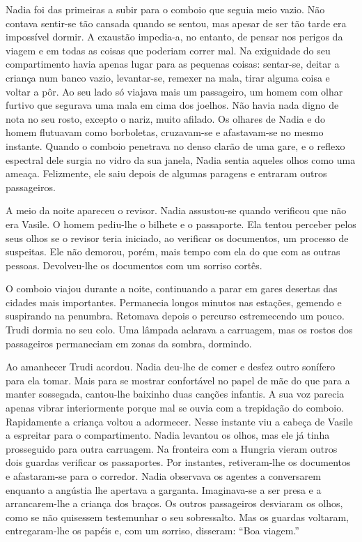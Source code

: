 Nadia foi das primeiras a subir para o comboio que
seguia meio vazio. Não contava sentir-se tão cansada quando se sentou,
mas apesar de ser tão tarde era impossível dormir. A exaustão
impedia-a, no entanto, de pensar nos perigos da viagem e em todas as
coisas que poderiam correr mal. Na exiguidade do seu compartimento havia
apenas lugar para as pequenas coisas: sentar-se, deitar a criança num
banco vazio, levantar-se, remexer na mala, tirar alguma coisa e voltar a
pôr. Ao seu lado só viajava mais um passageiro, um homem com olhar
furtivo que
segurava uma mala em cima dos joelhos. Não havia nada digno de nota no
seu rosto, excepto o nariz, muito afilado. Os olhares de Nadia e do
homem flutuavam como borboletas, cruzavam-se e afastavam-se no mesmo
instante. Quando o comboio penetrava no denso clarão de uma gare, e o
reflexo espectral dele surgia no vidro da sua janela, Nadia sentia
aqueles olhos como uma ameaça. Felizmente, ele saiu depois de algumas
paragens e entraram outros passageiros.

A meio da noite apareceu o revisor. Nadia assustou-se quando verificou
que não era Vasile. O homem pediu-lhe o bilhete e o passaporte. Ela
tentou perceber pelos seus olhos se o revisor teria iniciado, ao
verificar os documentos, um processo de suspeitas. Ele não demorou,
porém, mais tempo com ela do que com as outras pessoas. Devolveu-lhe os
documentos com um sorriso cortês.

O comboio viajou durante a noite, continuando a parar em gares desertas
das cidades mais importantes. Permanecia longos minutos nas estações,
gemendo e suspirando na penumbra. Retomava depois o percurso
estremecendo um pouco. Trudi dormia no seu colo. Uma lâmpada aclarava a
carruagem, mas os rostos dos passageiros permaneciam em zonas da sombra,
dormindo.

Ao amanhecer Trudi acordou. Nadia deu-lhe de comer e desfez outro
sonífero para ela tomar. Mais para se mostrar confortável no papel de
mãe do que para a manter sossegada, cantou-lhe baixinho duas canções
infantis. A sua voz parecia apenas vibrar interiormente porque mal se
ouvia com a trepidação do comboio. Rapidamente a criança voltou a
adormecer. Nesse instante viu a cabeça de
Vasile a espreitar para o compartimento. Nadia levantou os olhos, mas
ele já tinha prosseguido para outra carruagem. Na fronteira com a
Hungria vieram outros dois guardas verificar os passaportes. Por
instantes, retiveram-lhe os documentos e afastaram-se para o corredor.
Nadia observava os agentes a conversarem enquanto a angústia lhe
apertava a garganta. Imaginava-se a ser presa e a arrancarem-lhe a
criança dos braços. Os outros passageiros desviaram os olhos, como se
não quisessem testemunhar o seu sobressalto. Mas os guardas voltaram,
entregaram-lhe os
papéis e, com um sorriso, disseram: ``Boa viagem.''

